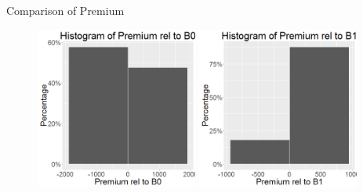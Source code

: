 \documentclass[xcolor=dvipsnames,12pt]{beamer}
\theoremstyle{definition}
\begin{document}
\begin{frame}{Comparison of Premium}
\begin{figure}

\graphicspath{ {../../0_relative_to_bundle_0/} }
\includegraphics[width=0.475\textwidth]{3_histogram_of_prem_rel_to_b0_2_col}
\hfill
\graphicspath{ {../../1_relative_to_bundle_1/} }
\includegraphics[width=0.475\textwidth]{3_histogram_of_prem_rel_to_bundle_1_2_col.png}
\end{figure}
\end{frame}
\end{document}
